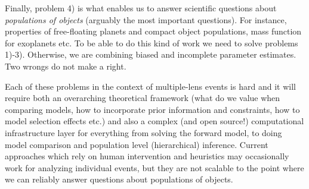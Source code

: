 \documentclass[12pt,dvipsnames]{report}
\begin{document}
Finally, problem 4) is what enables us to answer scientific questions about 
\emph{populations of objects} (arguably the most important questions). For instance,
properties of free-floating planets and compact object populations, mass function for 
exoplanets etc. To be able to do this kind of work we need to solve problems 1)-3). Otherwise,
 we are combining biased and incomplete parameter estimates. Two wrongs do not make a
right.

Each of these problems in the context of multiple-lens events is hard and it will require 
both an overarching theoretical framework (what do we value when comparing models, how to 
incorporate prior information and constraints, how to model selection effects etc.) and also 
a complex (and open source!) computational infrastructure layer for everything from solving the 
forward  model, to doing model comparison and population level (hierarchical) inference.
Current approaches which rely on human intervention and heuristics may 
occasionally work for analyzing individual events, but they are not scalable to the point where 
we can reliably answer questions about populations of objects.
\end{document}
